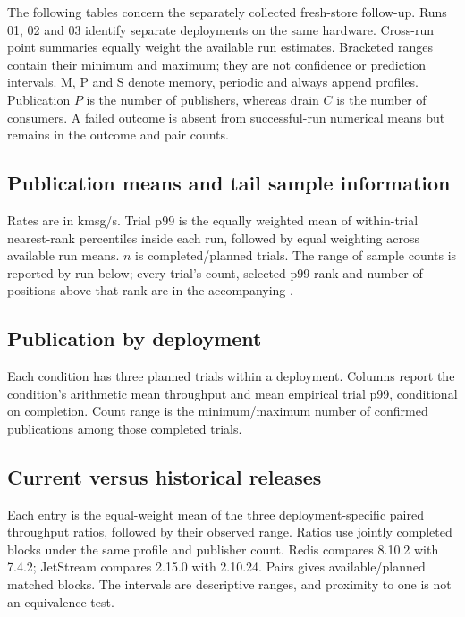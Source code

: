 The following tables concern the separately collected fresh-store follow-up. Runs 01, 02 and 03 identify separate deployments on the same hardware. Cross-run point summaries equally weight the available run estimates. Bracketed ranges contain their minimum and maximum; they are not confidence or prediction intervals. M, P and S denote memory, periodic and always append profiles. Publication $P$ is the number of publishers, whereas drain $C$ is the number of consumers. A failed outcome is absent from successful-run numerical means but remains in the outcome and pair counts.

\subsection{Publication means and tail sample information}
Rates are in kmsg/s. Trial p99 is the equally weighted mean of within-trial nearest-rank percentiles inside each run, followed by equal weighting across available run means. $n$ is completed/planned trials. The range of sample counts is reported by run below; every trial's count, selected p99 rank and number of positions above that rank are in the accompanying .
\begingroup\footnotesize\setlength{\tabcolsep}{3pt}

\endgroup

\subsection{Publication by deployment}
Each condition has three planned trials within a deployment. Columns report the condition's arithmetic mean throughput and mean empirical trial p99, conditional on completion. Count range is the minimum/maximum number of confirmed publications among those completed trials.
\begingroup\footnotesize\setlength{\tabcolsep}{3pt}

\endgroup

\subsection{Current versus historical releases}\label{app:version-contrasts}
Each entry is the equal-weight mean of the three deployment-specific paired throughput ratios, followed by their observed range. Ratios use jointly completed blocks under the same profile and publisher count. Redis compares 8.10.2 with 7.4.2; JetStream compares 2.15.0 with 2.10.24. Pairs gives available/planned matched blocks. The intervals are descriptive ranges, and proximity to one is not an equivalence test.
\begin{table}[htbp]
\centering\small

\caption{Current/historical publication throughput ratios for memory and periodic profiles.}
\label{tab:version-contrasts}
\end{table}
\FloatBarrier

